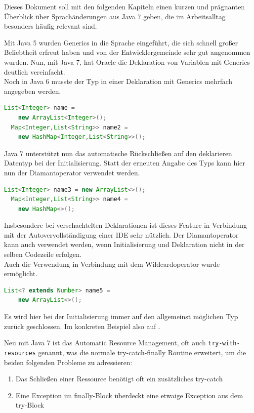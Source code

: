 \documentclass[times, 10pt,twocolumn]{article}
\begin{document}
Dieses Dokument soll mit den folgenden Kapiteln einen kurzen und prägnanten Überblick über Sprachänderungen aus Java 7 geben,
die im Arbeitsalltag besonders häufig relevant sind.

Mit Java 5 wurden Generics in die Sprache eingeführt, die sich schnell großer Beliebtheit erfreut haben und von der Entwicklergemeinde sehr gut angenommen wurden. Nun, mit Java 7, hat Oracle die Deklaration von Variablen mit Generics deutlich vereinfacht.\cite{oracleJavaRel}\\

Noch in Java 6 musste der Typ in einer Deklaration mit Generics mehrfach angegeben werden.
\begin{lstlisting}[language=java,breaklines=true]
  List<Integer> name =
    new ArrayList<Integer>();
  Map<Integer,List<String>> name2 =
    new HashMap<Integer,List<String>>();
\end{lstlisting}
Java 7 unterstützt nun das automatische Rückschließen auf den deklarieren Datentyp bei der Initialisierung.\cite{v2bJava7} Statt der erneuten Angabe des Typs kann hier nun der Diamantoperator verwendet werden.
\begin{lstlisting}[language=java,breaklines=true]
  List<Integer> name3 = new ArrayList<>();
  Map<Integer,List<String>> name4 =
    new HashMap<>();
\end{lstlisting}
Insbesondere bei verschachtelten Deklarationen ist dieses Feature in Verbindung mit der Autovervollständigung einer IDE sehr nützlich. Der Diamantoperator kann auch verwendet werden, wenn Initialisierung und Deklaration nicht in der selben Codezeile erfolgen.\cite{v2bJava7}\\

Auch die Verwendung in Verbindung mit dem Wildcardoperator wurde ermöglicht.
\begin{lstlisting}[language=java,breaklines=true]
  List<? extends Number> name5 =
    new ArrayList<>();
\end{lstlisting}
Es wird hier bei der Initialisierung immer auf den allgemeinst möglichen Typ zurück geschlossen. Im konkreten Beispiel also auf .\cite{v2bJava7}

\label{try_sec}
Neu mit Java 7 ist das Automatic Resource Management\cite{javainsel2}, oft auch \texttt{try-with-resources} genannt, was die normale try-catch-finally 
Routine erweitert, um die beiden folgenden Probleme zu adressieren:
\begin{enumerate}
\item Das Schließen einer Ressource benötigt oft ein zusätzliches try-catch
\item Eine Exception im finally-Block überdeckt eine etwaige Exception aus dem try-Block
\end{enumerate}
\end{document}
